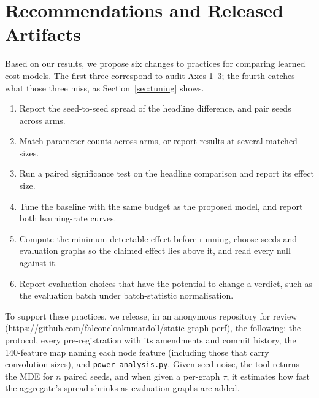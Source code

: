 \section{Recommendations and Released Artifacts}
\label{sec:recs}
Based on our results, we propose six changes to practices for comparing learned cost models. The first three correspond to
audit Axes 1--3; the fourth catches what those three miss, as Section~\ref{sec:tuning} shows.
\begin{enumerate}
\item Report the seed-to-seed spread of the headline difference, and pair seeds across arms.
\item Match parameter counts across arms, or report results at several matched sizes.
\item Run a paired significance test on the headline comparison and report its effect size.
\item Tune the baseline with the same budget as the proposed model, and report both learning-rate
  curves.
\item Compute the minimum detectable effect before running, choose seeds and evaluation graphs so the
  claimed effect lies above it, and read every null against it.
\item Report evaluation choices that have the potential to change a verdict, such as the evaluation batch under
  batch-statistic normalisation.
\end{enumerate}

To support these practices, we release, in an anonymous repository for review
(\url{https://github.com/falconcloaknmardoll/static-graph-perf}), the following: the protocol, every
pre-registration with its amendments and commit history, the 140-feature map naming each node feature
(including those that carry convolution sizes), and \texttt{power\_analysis.py}. Given seed noise, the
tool returns the MDE for $n$ paired seeds, and when given a per-graph $\tau$, it estimates how fast the aggregate's
spread shrinks as evaluation graphs are added.
